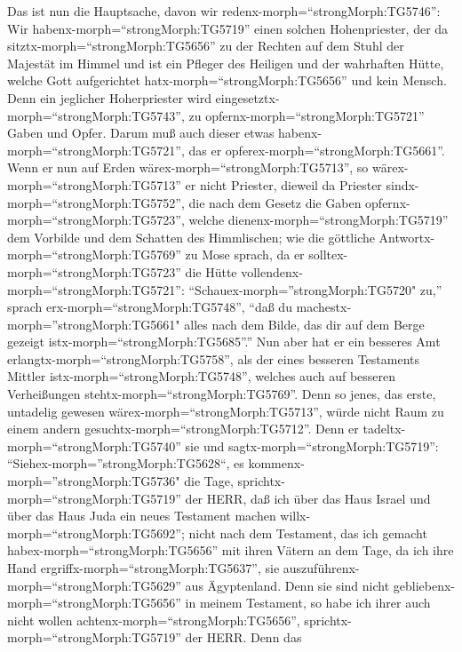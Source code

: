  Das ist nun die Hauptsache, davon wir
redenx-morph=``strongMorph:TG5746'': Wir
habenx-morph=``strongMorph:TG5719'' einen solchen Hohenpriester, der da
sitztx-morph=``strongMorph:TG5656'' zu der Rechten auf dem Stuhl der
Majestät im Himmel  und ist ein Pfleger des Heiligen und der
wahrhaften Hütte, welche Gott aufgerichtet
hatx-morph=``strongMorph:TG5656'' und kein Mensch.  Denn ein
jeglicher Hoherpriester wird eingesetztx-morph=``strongMorph:TG5743'',
zu opfernx-morph=``strongMorph:TG5721'' Gaben und Opfer. Darum muß auch
dieser etwas habenx-morph=``strongMorph:TG5721'', das er
opferex-morph=``strongMorph:TG5661''.  Wenn er nun auf Erden
wärex-morph=``strongMorph:TG5713'', so
wärex-morph=``strongMorph:TG5713'' er nicht Priester, dieweil da
Priester sindx-morph=``strongMorph:TG5752'', die nach dem Gesetz die
Gaben opfernx-morph=``strongMorph:TG5723'',  welche
dienenx-morph=``strongMorph:TG5719'' dem Vorbilde und dem Schatten des
Himmlischen; wie die göttliche Antwortx-morph=``strongMorph:TG5769'' zu
Mose sprach, da er solltex-morph=``strongMorph:TG5723'' die Hütte
vollendenx-morph=``strongMorph:TG5721'':
``Schauex-morph=''strongMorph:TG5720" zu,'' sprach
erx-morph=``strongMorph:TG5748'', ``daß du
machestx-morph=''strongMorph:TG5661" alles nach dem Bilde, das dir auf
dem Berge gezeigt istx-morph=``strongMorph:TG5685''.''  Nun
aber hat er ein besseres Amt erlangtx-morph=``strongMorph:TG5758'', als
der eines besseren Testaments Mittler istx-morph=``strongMorph:TG5748'',
welches auch auf besseren Verheißungen
stehtx-morph=``strongMorph:TG5769''.  Denn so jenes, das
erste, untadelig gewesen wärex-morph=``strongMorph:TG5713'', würde nicht
Raum zu einem andern gesuchtx-morph=``strongMorph:TG5712''. 
Denn er tadeltx-morph=``strongMorph:TG5740'' sie und
sagtx-morph=``strongMorph:TG5719'':
``Siehex-morph=''strongMorph:TG5628``, es
kommenx-morph=''strongMorph:TG5736" die Tage,
sprichtx-morph=``strongMorph:TG5719'' der HERR, daß ich über das Haus
Israel und über das Haus Juda ein neues Testament machen
willx-morph=``strongMorph:TG5692'';  nicht nach dem
Testament, das ich gemacht habex-morph=``strongMorph:TG5656'' mit ihren
Vätern an dem Tage, da ich ihre Hand
ergriffx-morph=``strongMorph:TG5637'', sie
auszuführenx-morph=``strongMorph:TG5629'' aus Ägyptenland. Denn sie sind
nicht gebliebenx-morph=``strongMorph:TG5656'' in meinem Testament, so
habe ich ihrer auch nicht wollen achtenx-morph=``strongMorph:TG5656'',
sprichtx-morph=``strongMorph:TG5719'' der HERR.  Denn das
